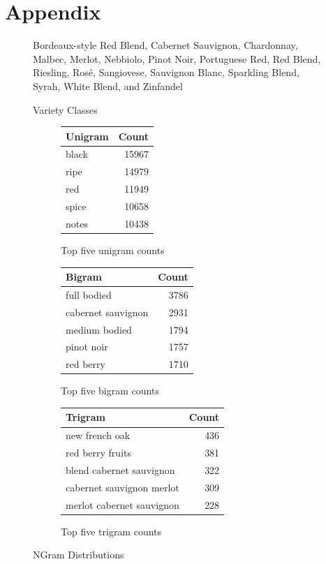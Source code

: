 \documentclass[12pt]{IEEEtran}
\begin{document}


\newpage
\section{Appendix}

\begin{figure}[h]
    Bordeaux-style Red Blend, Cabernet Sauvignon, Chardonnay, Malbec, Merlot, Nebbiolo, Pinot Noir, Portuguese Red, Red Blend, Riesling, Rosé, Sangiovese, Sauvignon Blanc, Sparkling Blend, Syrah, White Blend, and Zinfandel
    \caption{Variety Classes}
    \label{variety_classes}
\end{figure}

\begin{figure}[h]
    \centering
    \begin{subfigure}[t]{\columnwidth}
        \centering
        \begin{tabular}{ lr  }
            \hline
            Unigram & Count \\
            \hline
            black  & 15967 \\
            ripe   & 14979 \\
            red    & 11949 \\
            spice  & 10658 \\
            notes  & 10438
        \end{tabular}
        \caption{ Top five unigram counts}
    \end{subfigure}
    \begin{subfigure}[t]{\columnwidth}
        \centering
        \begin{tabular}{ lr  }
            \hline
            Bigram & Count \\
            \hline
            full bodied & 3786 \\
            cabernet sauvignon & 2931 \\
            medium bodied & 1794 \\
            pinot noir & 1757 \\
            red berry & 1710
        \end{tabular}
        \caption{ Top five bigram counts}
    \end{subfigure}
    \begin{subfigure}[t]{\columnwidth}
        \centering
        \begin{tabular}{ lr  }
            \hline
            Trigram & Count \\
            \hline
            new french oak  & 436 \\
            red berry fruits & 381 \\
            blend cabernet sauvignon & 322 \\
            cabernet sauvignon merlot & 309 \\
            merlot cabernet sauvignon & 228 
        \end{tabular}
        \caption{ Top five trigram counts} 
    \end{subfigure} 
    \caption{NGram Distributions}
    \label{ngram_distribution}
\end{figure}
\end{document}
